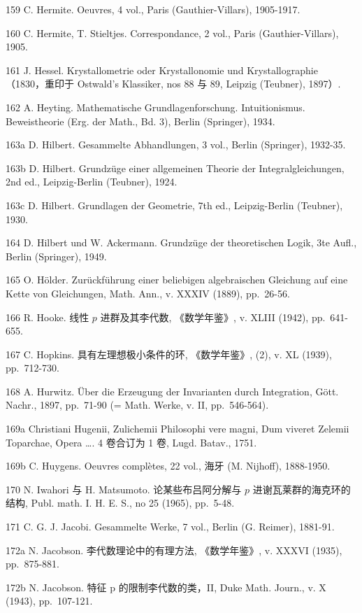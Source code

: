 159 C. Hermite. Oeuvres, 4 vol., Paris (Gauthier-Villars), 1905-1917.

160 C. Hermite, T. Stieltjes. Correspondance, 2 vol., Paris (Gauthier-Villars), 1905.

161 J. Hessel. Krystallometrie oder Krystallonomie und Krystallographie （1830，重印于 Ostwald's Klassiker, nos 88 与 89, Leipzig (Teubner), 1897）.

162 A. Heyting. Mathematische Grundlagenforschung. Intuitionismus. Beweistheorie (Erg. der Math., Bd. 3), Berlin (Springer), 1934.

163a D. Hilbert. Gesammelte Abhandlungen, 3 vol., Berlin (Springer), 1932-35.

163b D. Hilbert. Grundzüge einer allgemeinen Theorie der Integralgleichungen, 2nd ed., Leipzig-Berlin (Teubner), 1924.

163c D. Hilbert. Grundlagen der Geometrie, 7th ed., Leipzig-Berlin (Teubner), 1930.

164 D. Hilbert und W. Ackermann. Grundzüge der theoretischen Logik, 3te Aufl., Berlin (Springer), 1949.

165 O. Hölder. Zurückführung einer beliebigen algebraischen Gleichung auf eine Kette von Gleichungen, Math. Ann., v. XXXIV (1889), pp.~26-56.

166 R. Hooke. 线性 \(p\) 进群及其李代数, 《数学年鉴》, v. XLIII (1942), pp.~641-655.

167 C. Hopkins. 具有左理想极小条件的环, 《数学年鉴》, (2), v. XL (1939), pp.~712-730.

168 A. Hurwitz. Über die Erzeugung der Invarianten durch Integration, Gött. Nachr., 1897, pp.~71-90 (= Math. Werke, v. II, pp.~546-564).

169a Christiani Hugenii, Zulichemii Philosophi vere magni, Dum viveret Zelemii Toparchae, Opera \ldots. 4 卷合订为 1 卷, Lugd. Batav., 1751.

169b C. Huygens. Oeuvres complètes, 22 vol., 海牙 (M. Nijhoff), 1888-1950.

170 N. Iwahori 与 H. Matsumoto. 论某些布吕阿分解与 \(p\) 进谢瓦莱群的海克环的结构, Publ. math. I. H. E. S., no 25 (1965), pp.~5-48.

171 C. G. J. Jacobi. Gesammelte Werke, 7 vol., Berlin (G. Reimer), 1881-91.

172a N. Jacobson. 李代数理论中的有理方法, 《数学年鉴》, v. XXXVI (1935), pp.~875-881.

172b N. Jacobson. 特征 p 的限制李代数的类，II, Duke Math. Journ., v. X (1943), pp.~107-121.

